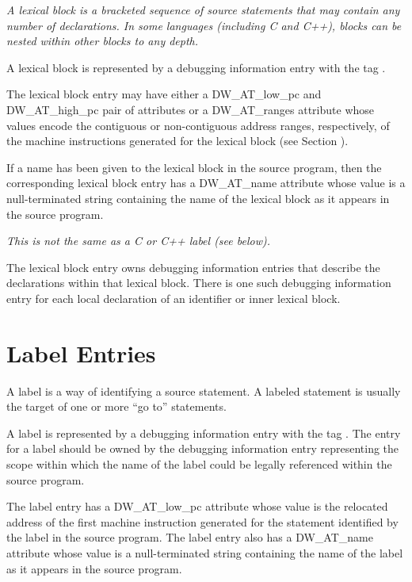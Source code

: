 \textit{A lexical block is a bracketed sequence of source statements
that may contain any number of declarations. In some languages
(including C and C++), blocks can be nested within other
blocks to any depth.}

A lexical block is represented by a debugging information
entry with the 
tag .

The lexical block entry may have either a DW\_AT\_low\_pc and
DW\_AT\_high\_pc pair of attributes or a DW\_AT\_ranges attribute
whose values encode the contiguous or non-contiguous address
ranges, respectively, of the machine instructions generated
for the lexical block 
(see Section ).

If a name has been given to the lexical block in the source
program, then the corresponding lexical block entry has a
DW\_AT\_name attribute whose value is a null-terminated string
containing the name of the lexical block as it appears in
the source program.

\textit{This is not the same as a C or C++ label (see below).}

The lexical block entry owns debugging information entries that
describe the declarations within that lexical block. There is
one such debugging information entry for each local declaration
of an identifier or inner lexical block.

\section{Label Entries}
\label{chap:labelentries}

A label is a way of identifying a source statement. A labeled
statement is usually the target of one or more ``go to''
statements.

A label is represented by a debugging information entry with
the 
tag . 
The entry for a label should be owned by
the debugging information entry representing the scope within
which the name of the label could be legally referenced within
the source program.

The label entry has a DW\_AT\_low\_pc attribute whose value
is the relocated address of the first machine instruction
generated for the statement identified by the label in
the source program.  The label entry also has a DW\_AT\_name
attribute whose value is a null-terminated string containing
the name of the label as it appears in the source program.


